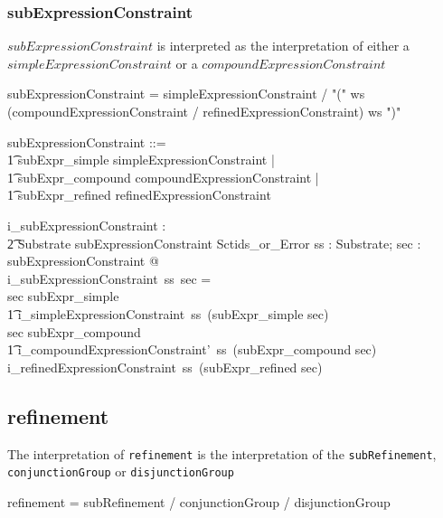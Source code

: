 \documentclass{article}
\def\spec#1{{\tt #1}}
\def\bnf#1{{\scriptsize {{#1}} }}
\begin{document}
\subsubsection{subExpressionConstraint}
$subExpressionConstraint$ is interpreted as the interpretation of either a $simpleExpressionConstraint$
or a $compoundExpressionConstraint$
\begin{framed}
\noindent
\bnf{subExpressionConstraint = simpleExpressionConstraint / "(" ws (compoundExpressionConstraint / refinedExpressionConstraint)  ws ")"}
\end{framed}

\begin{zed}
subExpressionConstraint ::= \\
\t1 subExpr\_simple \ldata simpleExpressionConstraint \rdata | \\
\t1 subExpr\_compound \ldata compoundExpressionConstraint \rdata | \\
\t1 subExpr\_refined \ldata refinedExpressionConstraint \rdata
\end{zed}

\begin{gendef}
   i\_subExpressionConstraint : \\
\t2 Substrate \fun subExpressionConstraint \fun Sctids\_or\_Error
\where
   \forall ss : Substrate; sec : subExpressionConstraint @ \\
i\_subExpressionConstraint~ss~sec = \\
   \IF sec \in \ran subExpr\_simple \\
\t1 \THEN i\_simpleExpressionConstraint~ss~(subExpr\_simple \inv sec) \\
    \ELSE \IF sec \in \ran subExpr\_compound \\
\t1 \THEN i\_compoundExpressionConstraint'~ss~(subExpr\_compound \inv sec) \\
    \ELSE i\_refinedExpressionConstraint~ss~(subExpr\_refined \inv sec) 
\end{gendef}

\subsection{refinement}
The interpretation of \spec{refinement} is the interpretation of the \spec{subRefinement}, \spec{conjunctionGroup} or \spec{disjunctionGroup}
\begin{framed}
\noindent
\bnf{refinement = subRefinement / conjunctionGroup / disjunctionGroup}
\end{framed}
\end{document}
